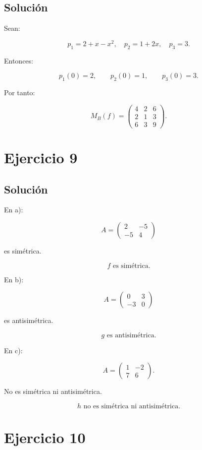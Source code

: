\documentclass[11pt,a4paper]{article}
\begin{document}
\subsection{Solución}

Sean:

\[
p_1=2+x-x^2,
\quad
p_2=1+2x,
\quad
p_3=3.
\]

Entonces:

\[
p_1(0)=2,
\qquad
p_2(0)=1,
\qquad
p_3(0)=3.
\]

Por tanto:

\[
\boxed{
M_B(f)=
\begin{pmatrix}
4&2&6\\
2&1&3\\
6&3&9
\end{pmatrix}.
}
\]

\section{Ejercicio 9}
\subsection{Solución}

En a):

\[
A=
\begin{pmatrix}
2&-5\\
-5&4
\end{pmatrix}
\]

es simétrica.

\[
\boxed{f\text{ es simétrica}.}
\]

En b):

\[
A=
\begin{pmatrix}
0&3\\
-3&0
\end{pmatrix}
\]

es antisimétrica.

\[
\boxed{g\text{ es antisimétrica}.}
\]

En c):

\[
A=
\begin{pmatrix}
1&-2\\
7&6
\end{pmatrix}.
\]

No es simétrica ni antisimétrica.

\[
\boxed{h\text{ no es simétrica ni antisimétrica}.}
\]

\section{Ejercicio 10}
\end{document}
